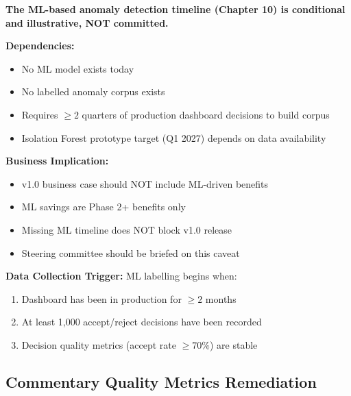 \begin{tcolorbox}[colback=red!10,colframe=red!70,title=\faIcon{exclamation-triangle} ML Timeline Caveat - Important]

\textbf{The ML-based anomaly detection timeline (Chapter 10) is conditional 
and illustrative, NOT committed.}

\textbf{Dependencies:}
\begin{itemize}
    \item No ML model exists today
    \item No labelled anomaly corpus exists
    \item Requires $\geq 2$ quarters of production dashboard decisions to build corpus
    \item Isolation Forest prototype target (Q1 2027) depends on data availability
\end{itemize}

\textbf{Business Implication:}
\begin{itemize}
    \item v1.0 business case should NOT include ML-driven benefits
    \item ML savings are Phase 2+ benefits only
    \item Missing ML timeline does NOT block v1.0 release
    \item Steering committee should be briefed on this caveat
\end{itemize}

\textbf{Data Collection Trigger:} ML labelling begins when:
\begin{enumerate}
    \item Dashboard has been in production for $\geq 2$ months
    \item At least 1,000 accept/reject decisions have been recorded
    \item Decision quality metrics (accept rate $\geq 70\%$) are stable
\end{enumerate}
\end{tcolorbox}

\subsection{Commentary Quality Metrics Remediation}
\label{sec:quality-remediation}

